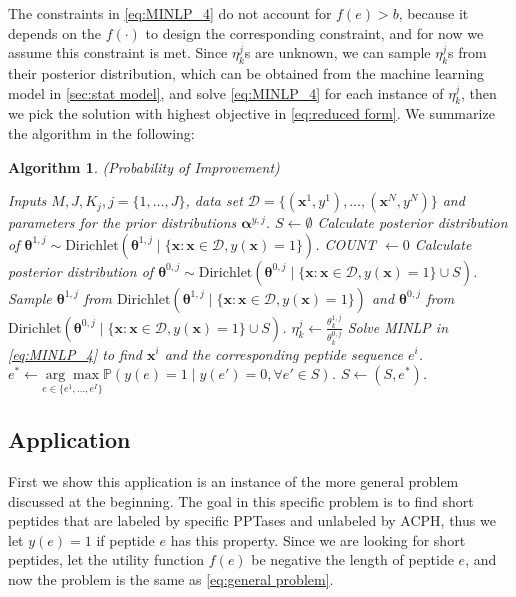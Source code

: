 \documentclass[11pt]{article}
\newcommand{\Prob}{\mathbb{P}}
\newtheorem{Algorithm}{Algorithm}
\begin{document}
The constraints in \eqref{eq:MINLP_4} do not account for $f(e) > b$, because it depends on
the $f(\cdot)$ to design the corresponding constraint, and for now we assume this
constraint is met. Since $\eta^j_k$s are unknown, we can sample $\eta^j_k$s from their posterior 
distribution, which can be obtained from the machine learning model in \ref{sec:stat model},
and solve \eqref{eq:MINLP_4} for each instance of $\eta^j_k$, then we pick
the solution with highest objective in \eqref{eq:reduced form}. We summarize 
the algorithm in the following:
\begin{Algorithm}(Probability of Improvement) \label{algo1}
\begin{algorithmic}[1]
  \REQUIRE Inputs $M, J, K_j, j = \{1, \ldots, J\}$, data set $\mathcal{D} = 
  \{(\bm{x}^1, y^1), \ldots, (\bm{x}^N, y^N)\}$ and parameters for the prior 
  distributions $\bm{\alpha}^{y, j}$.
  \STATE $S \leftarrow \emptyset $
  \STATE Calculate posterior distribution of $\bm{\theta}^{1, j} \sim 
  \text{Dirichlet} (\bm{\theta}^{1, j} \mid \{\bm{x}: \bm{x} \in \mathcal{D}, 
  y(\bm{x}) = 1\})$.
    \STATE COUNT $\leftarrow 0$
    \STATE Calculate posterior distribution of $\bm{\theta}^{0, j} \sim 
    \text{Dirichlet} (\bm{\theta}^{0, j} \mid \{\bm{x}: \bm{x} \in \mathcal{D}, 
    y(\bm{x}) = 1\} \cup S)$.
      \STATE Sample $\bm{\theta}^{1, j}$ from $\text{Dirichlet} (\bm{\theta}^{1, j} 
      \mid \{\bm{x}: \bm{x} \in \mathcal{D}, y(\bm{x}) = 1\})$ and $\bm{\theta}^{0, j}$
      from $\text{Dirichlet} (\bm{\theta}^{0, j} \mid \{\bm{x}: \bm{x} \in \mathcal{D}, 
      y(\bm{x}) = 1\} \cup S)$.
      \STATE $\eta^j_k \leftarrow \frac{\theta^{1, j}_k}{\theta^{0, j}_k}$
      \STATE Solve MINLP in \eqref{eq:MINLP_4} to find $\bm{x}^i$ and the corresponding
      peptide sequence $e^i$.
    \ENDFOR
    \STATE $e^* \leftarrow \underset{e \in \{e^1, \ldots, e^I\}}
    {\arg \max} \Prob (y(e) = 1 \mid y(e') = 0, \forall e' \in S)$.
    \STATE $S \leftarrow (S, e^*)$.
  \ENDFOR
\end{algorithmic}
\end{Algorithm}


\subsection{Application} \label{sec:application}
First we show this application is an instance of the more general problem discussed
at the beginning. The goal in this specific problem is to find short peptides that 
are labeled by specific PPTases and unlabeled by ACPH, thus we let $y(e) = 1$
if peptide $e$ has this property. Since we are looking for short peptides, let the
utility function $f(e)$ be negative the length of peptide $e$, and now the problem
is the same as \eqref{eq:general problem}.
\end{document}
